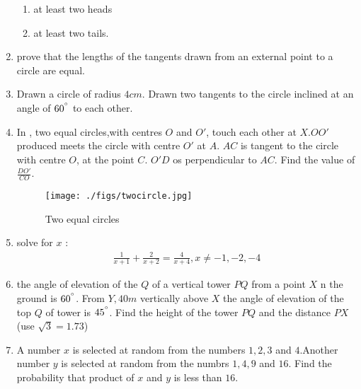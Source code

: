 \documentclass{article}
\begin{document}
\begin{enumerate}
\begin{enumerate}[label=\roman*]
 \item at least two heads
						
 \item at least two tails.
	      \end{enumerate}
\item prove that the lengths of the tangents drawn from an external point to a circle are equal.				
\item Drawn a circle of radius $4 cm$. Drawn two tangents to the circle inclined at an angle of $60^{\degree}$ to each other.
\item In , two equal circles,with centres $O$ and $O'$, touch each other at $X$.$OO'$ produced meets the circle with centre $O'$ at $A$. $AC$ is tangent to the circle with centre $O$, at the point $C$. $O'D$ os perpendicular to $AC$. Find the value of $\frac{DO'}{CO}$.
  \begin{figure}[H]
   \texttt{[image: ./figs/twocircle.jpg]}
    \caption{Two equal circles}
     \label{fig:twocircle}
     \end{figure}
\item solve for $x$ :
	\begin{align}
		\frac{1}{x+1}+\frac{2}{x+2}=\frac{4}{x+4},x \not=-1,-2,-4
	\end{align}
\item the angle of elevation of the $Q$ of a vertical tower $PQ$ from a point $X$ n the ground is $60^{\degree}$. From $Y,40 m$ vertically above $X$ the angle of elevation of the top $Q$ of tower is $45^{\degree}$. Find the height of the tower $PQ$ and the distance $PX$ (use $\sqrt{3}=1.73$)	
\item A number $x$ is selected at random from the numbers $1,2,3$ and $4$.Another number $y$ is selected at random from the numbrs $1,4,9$ and $16$. Find the probability that product of $x$ and $y$ is less than $16$.
\end{enumerate}
\end{document}

